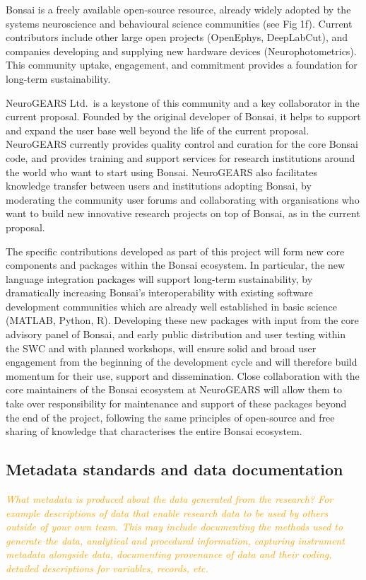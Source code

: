 \documentclass[a4paper,11pt]{article}
\begin{document}
Bonsai is a freely available open-source resource, already widely adopted by
the systems neuroscience and behavioural science communities (see Fig 1f).
Current contributors include other large open projects (OpenEphys, DeepLabCut),
and companies developing and supplying new hardware devices
(Neurophotometrics). This community uptake, engagement, and commitment provides
a foundation for long-term sustainability.

NeuroGEARS Ltd.\ is a keystone of this community and a key collaborator in the
current proposal. Founded by the original developer of Bonsai, it helps to
support and expand the user base well beyond the life of the current proposal.
NeuroGEARS currently provides quality control and curation for the core Bonsai
code, and provides training and support services for research institutions
around the world who want to start using Bonsai. NeuroGEARS also facilitates
knowledge transfer between users and institutions adopting Bonsai, by
moderating the community user forums and collaborating with organisations who
want to build new innovative research projects on top of Bonsai, as in the
current proposal.

The specific contributions developed as part of this project will form new core
components and packages within the Bonsai ecosystem. In particular, the new
language integration packages will support long-term sustainability, by
dramatically increasing Bonsai's interoperability with existing software
development communities which are already well established in basic science
(MATLAB, Python, R). Developing these new packages with input from the core
advisory panel of Bonsai, and early public distribution and user testing within
the SWC and with planned workshops, will ensure solid and broad user engagement
from the beginning of the development cycle and will therefore build momentum
for their use, support and dissemination. Close collaboration with the core
maintainers of the Bonsai ecosystem at NeuroGEARS will allow them to take over
responsibility for maintenance and support of these packages beyond the end of
the project, following the same principles of open-source and free sharing of
knowledge that characterises the entire Bonsai ecosystem.

\subsection{Metadata standards and data documentation}

\textcolor{orange}{\textit{What metadata is produced about the data generated from the research? For example descriptions of data that enable research data to be used by others outside of your own team.  This may include documenting the methods used to generate the data, analytical and procedural information, capturing instrument metadata alongside data, documenting provenance of data and their coding, detailed descriptions for variables, records, etc.}}
\end{document}
